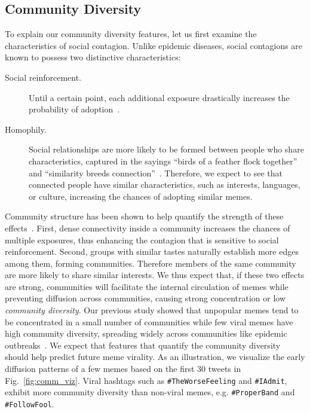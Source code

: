 \documentclass[letterpaper]{article}
\begin{document}
\subsection{Community Diversity}

To explain our community diversity features, let us first examine the characteristics of social contagion. Unlike epidemic diseases, social contagions are known to possess two distinctive characteristics: 

\begin{description}

\item[Social reinforcement.] Until a certain point, each additional exposure drastically increases the probability of adoption~\cite{Centola2007weakTies,bakshy2009adoption,romero_differences_2011,Centola2010SpreadExp}.

\item[Homophily.] Social relationships are more likely to be formed between people who share characteristics, captured in the sayings ``birds of a feather flock together'' and ``similarity breeds connection''~\cite{McPherson2001homophily,Centola2011homophily}. Therefore, we expect to see that connected people have similar characteristics, such as interests, languages, or culture, increasing the chances of adopting similar memes.  

\end{description}

Community structure has been shown to help quantify the strength of these effects~\cite{colbaugh2012early,weng2013viral}. 
First, dense connectivity inside a community increases the chances of multiple exposures, thus enhancing the contagion that is sensitive to social reinforcement. Second, groups with similar tastes naturally establish more edges among them, forming communities. Therefore members of the same community are more likely to share similar interests. We thus expect that, if these two effects are strong, communities will facilitate the internal circulation of memes while preventing diffusion across communities, causing strong concentration or low \emph{community diversity}.
Our previous study showed that unpopular memes tend to be concentrated in a small number of communities while few viral memes have high community diversity, spreading widely across communities like epidemic outbreaks~\cite{weng2013viral}. We expect that features that quantify the community diversity should help predict future meme virality. As an illustration, we visualize the early diffusion patterns of a few memes based on the first 30 tweets in Fig.~\ref{fig:comm_viz}. Viral hashtags such as \texttt{\#TheWorseFeeling} and \texttt{\#IAdmit}, exhibit more community diversity than non-viral me\-mes, e.g. \texttt{\#ProperBand} and \texttt{\#FollowFool}.
\end{document}
